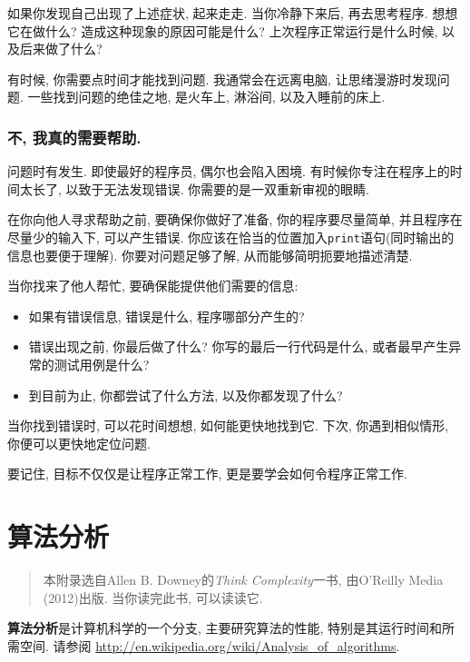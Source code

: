 \documentclass[10pt]{book}
\begin{document}
如果你发现自己出现了上述症状, 起来走走. 
当你冷静下来后, 再去思考程序. 
想想它在做什么? 造成这种现象的原因可能是什么?
上次程序正常运行是什么时候, 以及后来做了什么?

有时候, 你需要点时间才能找到问题. 
我通常会在远离电脑, 让思绪漫游时发现问题. 
一些找到问题的绝佳之地, 是火车上, 淋浴间, 以及入睡前的床上. 


\subsection{不, 我真的需要帮助.}

问题时有发生. 即使最好的程序员, 偶尔也会陷入困境. 
有时候你专注在程序上的时间太长了, 以致于无法发现错误. 
你需要的是一双重新审视的眼睛. 

在你向他人寻求帮助之前, 要确保你做好了准备, 
你的程序要尽量简单, 并且程序在尽量少的输入下, 可以产生错误. 
你应该在恰当的位置加入{\tt print}语句(同时输出的信息也要便于理解). 
你要对问题足够了解, 从而能够简明扼要地描述清楚. 

当你找来了他人帮忙, 要确保能提供他们需要的信息:

\begin{itemize}

\item 如果有错误信息, 错误是什么, 程序哪部分产生的?

\item 错误出现之前, 你最后做了什么?
你写的最后一行代码是什么, 或者最早产生异常的测试用例是什么?

\item 到目前为止, 你都尝试了什么方法, 以及你都发现了什么?

\end{itemize}

当你找到错误时, 可以花时间想想, 如何能更快地找到它. 
下次, 你遇到相似情形, 你便可以更快地定位问题. 

要记住, 目标不仅仅是让程序正常工作, 更是要学会如何令程序正常工作. 


\chapter{算法分析}
\label{algorithms}

\begin{quote}
本附录选自Allen B. Downey的{\it Think Complexity}一书, 由O'Reilly Media (2012)出版. 
当你读完此书, 可以读读它. 
\end{quote}

{\bf 算法分析}是计算机科学的一个分支, 主要研究算法的性能, 特别是其运行时间和所需空间. 
请参阅
\url{http://en.wikipedia.org/wiki/Analysis_of_algorithms}.
 
\end{document}
